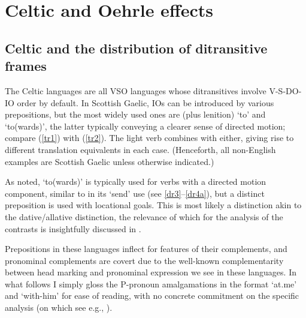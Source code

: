 \documentclass[output=paper,colorlinks,citecolor=brown]{langscibook}
\begin{document}
\section{Celtic and Oehrle effects}

\subsection{Celtic and the distribution of ditransitive frames}

The Celtic languages are all VSO languages whose ditransitives involve V-S-DO-IO order by default. In Scottish Gaelic, IOs can be introduced by various prepositions, but the most widely used ones are  (plus lenition) `to' and  `to(wards)', the latter typically conveying a clearer sense of directed motion; compare (\ref{tr1}) with (\ref{tr2}). The light verb  combines with either, giving rise to different translation equivalents in each case. (Henceforth, all non-English examples are Scottish Gaelic unless otherwise indicated.)



\noindent As noted,  `to(wards)' is typically used for verbs with a directed motion component, similar to  in its `send' use (see \ref{dr3}--\ref{dr4a}), but a distinct preposition  is used with locational goals. This is most likely a distinction akin to the dative/allative distinction, the relevance of which for the analysis of the  contrasts is insightfully discussed in \citet{gt:Rappaport:2008}.  



\noindent Prepositions in these languages inflect for features of their complements, and pronominal complements are covert due to the well-known complementarity between head marking and pronominal expression we see in these languages. In what follows I simply gloss the P-pronoun amalgamations in the format `at.me' and `with-him' for ease of reading, with no concrete commitment on the specific analysis (on which see e.g., \citealt{gt:McCloskey:1984a}).  
\end{document}
